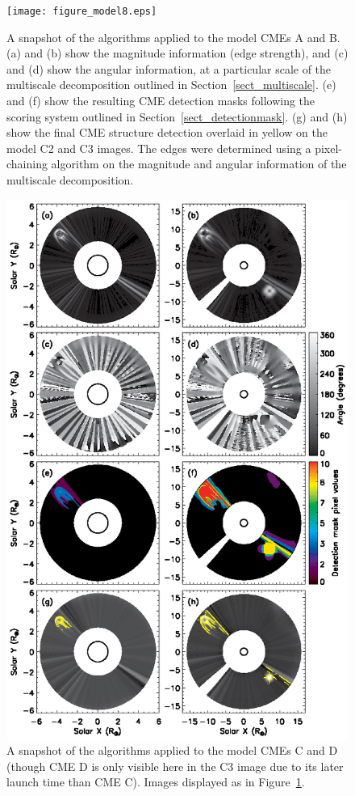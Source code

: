 \documentclass[preprint2]{aastex}
\begin{document}
\begin{figure}[!t]
\centerline{\texttt{[image: figure\_model8.eps]}}
\caption{A snapshot of the algorithms applied to the model CMEs A and B. (a) and (b) show the magnitude information (edge strength), and (c) and (d) show the angular information, at a particular scale of the multiscale decomposition outlined in Section~\ref{sect_multiscale}. (e) and (f) show the resulting CME detection masks following the scoring system outlined in Section~\ref{sect_detectionmask}. (g) and (h) show the final CME structure detection overlaid in yellow on the model C2 and C3 images. The edges were determined using a pixel-chaining algorithm on the magnitude and angular information of the multiscale decomposition.}
\label{figure_model8}
\end{figure}

\begin{figure}[!t]
\centerline{\includegraphics[scale=0.78, clip=true, trim=0 0 0 0]{figure_model8_2.eps}}
\caption{A snapshot of the algorithms applied to the model CMEs C and D (though CME D is only visible here in the C3 image due to its later launch time than CME C). Images displayed as in Figure~\ref{figure_model8}.}
\label{figure_model8_2}
\end{figure}
\end{document}
